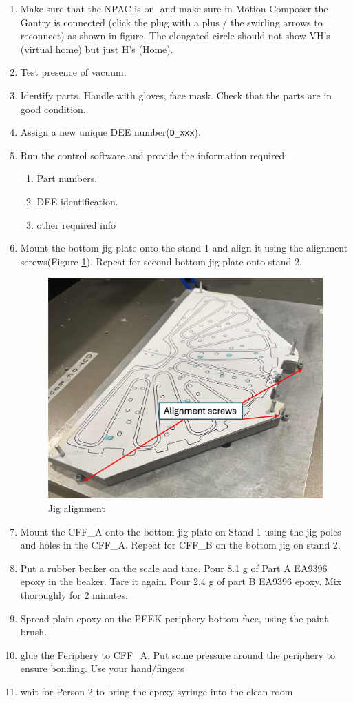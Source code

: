 \documentclass[12pt]{cornelltfpxsop}
\begin{document}
\begin{paracol}{2}
\begin{enumerate}
\item Make sure that the NPAC is on, and make sure in Motion Composer the Gantry is connected (click the plug with a plus / the swirling arrows to reconnect) as shown in figure. The elongated circle should not show VH's (virtual home) but just H's (Home).
    \item Test presence of vacuum.        
    \item Identify parts. Handle with gloves, face mask. Check that the parts are in good condition.
    \item Assign a new unique DEE number(\texttt{D\_xxx}).
    \item Run the control software and provide the information required:
    \begin{enumerate}
        \item Part numbers.
        \item DEE identification.
        \item other required info
    \end{enumerate}
    \item Mount the bottom jig plate onto the stand 1 and align it using the alignment screws(Figure \ref{JigAlignment}). Repeat for second bottom jig plate onto stand 2.
    \begin{figure}
        \centering
        \includegraphics[width=0.8\linewidth]{img/jig_alignment.png}
        \caption{Jig alignment}
        \label{JigAlignment}
    \end{figure}
    \item Mount the CFF\_A onto the bottom jig plate on Stand 1 using the jig poles and holes in the CFF\_A. Repeat for CFF\_B on the bottom jig on stand 2.
    \item Put a rubber beaker on the scale and tare. Pour 8.1 g of Part A EA9396 epoxy in the beaker. Tare it again. Pour 2.4 g of part B EA9396 epoxy. Mix thoroughly for 2 minutes.   
    \item Spread plain epoxy on the PEEK periphery bottom face, using the paint brush.
    \item glue the Periphery to CFF\_A. Put some pressure around the periphery to ensure bonding. Use your hand/fingers 
    \item wait for Person 2 to bring the epoxy syringe into the clean room


\end{enumerate}
\end{paracol}
\end{document}
